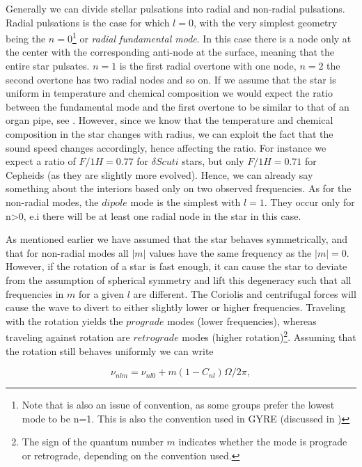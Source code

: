 Generally we can divide stellar pulsations into radial and non-radial pulsations. Radial pulsations is the case for which $l=0$, with the very simplest geometry being the $n=0$\footnote{Note that is also an issue of convention, as some groups prefer the lowest mode to be n=1. This is also the convention used in GYRE (discussed in )} or \textit{radial fundamental mode}. In this case there is a node only at the center with the corresponding anti-node at the surface, meaning that the entire star pulsates. $n=1$ is the first radial overtone with one node, $n=2$ the second overtone has two radial nodes and so on. %
If we assume that the star is uniform in temperature and chemical composition we would expect the ratio between the fundamental mode and the first overtone to be similar to that of an organ pipe, see \citet{aerts2010}. However, since we know that the temperature and chemical composition in the star changes with radius, we can exploit the fact that the sound speed changes accordingly, hence affecting the ratio. For instance we expect a ratio of $F/1H = 0.77$ for $\delta Scuti$ stars, but only $F/1H=0.71$ for Cepheids (as they are slightly more evolved). Hence, we can already say something about the interiors based only on two observed frequencies. As for the non-radial modes, the $dipole$ mode is the simplest with $l=1$. They occur only for n>0, e.i there will be at least one radial node in the star in this case. 

As mentioned earlier we have assumed that the star behaves symmetrically, and that for non-radial modes all $|m|$ values have the same frequency as the $|m|=0$. However, if the rotation of a star is fast enough, it can cause the star to deviate from the assumption of spherical symmetry and lift this degeneracy such that all frequencies in $m$ for a given $l$ are different. The Coriolis and centrifugal forces will cause the wave to divert to either slightly lower or higher frequencies. Traveling with the rotation yields the $prograde$ modes (lower frequencies), whereas traveling against rotation are $retrograde$ modes (higher rotation)\footnote{The sign of the quantum number $m$ indicates whether the mode is prograde or retrograde, depending on the convention used.}. Assuming that the rotation still behaves uniformly we can write 

\begin{equation}
    \nu_{nlm} = \nu_{nl0}+ m(1-C_{nl})\Omega/2\pi,
\end{equation}

